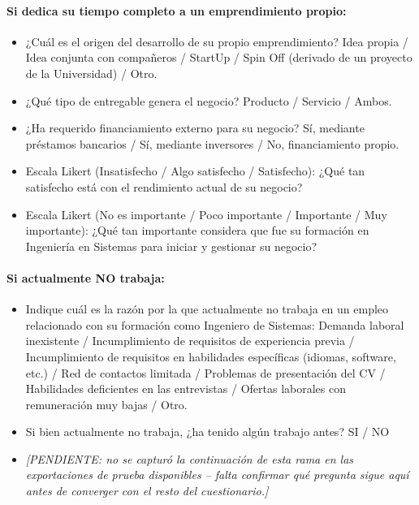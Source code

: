 \documentclass[12pt]{article}
\begin{document}
\paragraph{Si dedica su tiempo completo a un emprendimiento propio:}
\begin{itemize}[nosep]
    \item ¿Cuál es el origen del desarrollo de su propio emprendimiento?
    Idea propia / Idea conjunta con compañeros / StartUp / Spin Off
    (derivado de un proyecto de la Universidad) / Otro.
    \item ¿Qué tipo de entregable genera el negocio? Producto / Servicio
    / Ambos.
    \item ¿Ha requerido financiamiento externo para su negocio? Sí,
    mediante préstamos bancarios / Sí, mediante inversores / No,
    financiamiento propio.
    \item Escala Likert (Insatisfecho / Algo satisfecho / Satisfecho):
    ¿Qué tan satisfecho está con el rendimiento actual de su negocio?
    \item Escala Likert (No es importante / Poco importante / Importante
    / Muy importante): ¿Qué tan importante considera que fue su formación
    en Ingeniería en Sistemas para iniciar y gestionar su negocio?
\end{itemize}

\paragraph{Si actualmente NO trabaja:}
\begin{itemize}[nosep]
    \item Indique cuál es la razón por la que actualmente no trabaja en
    un empleo relacionado con su formación como Ingeniero de Sistemas:
    Demanda laboral inexistente / Incumplimiento de requisitos de
    experiencia previa / Incumplimiento de requisitos en habilidades
    específicas (idiomas, software, etc.) / Red de contactos limitada /
    Problemas de presentación del CV / Habilidades deficientes en las
    entrevistas / Ofertas laborales con remuneración muy bajas / Otro.
    \item Si bien actualmente no trabaja, ¿ha tenido algún trabajo antes?
    SI / NO
    \item \textit{[PENDIENTE: no se capturó la continuación de esta rama
    en las exportaciones de prueba disponibles -- falta confirmar qué
    pregunta sigue aquí antes de converger con el resto del
    cuestionario.]}
\end{itemize}
\end{document}
